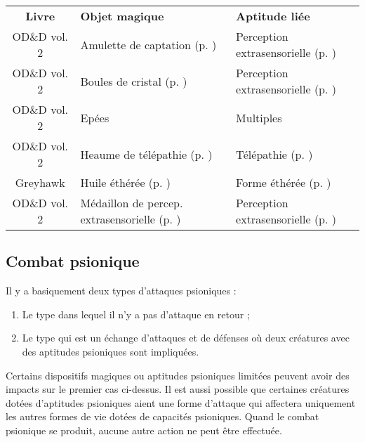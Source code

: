 \bigskip
\begin{tabular}{cll}
\textbf{Livre}  & \textbf{Objet magique}    & \textbf{Aptitude liée} \\
OD\&D vol. 2     & Amulette de captation (p. \pageref{objet-amulette-captation}) & Perception extrasensorielle (p. \pageref{magicien-ESP}) \\
OD\&D vol. 2     & Boules de cristal (p. \pageref{objet-boule-cristal}) & Perception extrasensorielle (p. \pageref{magicien-ESP}) \\
OD\&D vol. 2     & Epées                     & Multiples \\
OD\&D vol. 2     & Heaume de télépathie (p. \pageref{objet-heaume-telepathie})   & Télépathie (p. \pageref{objet-heaume-telepathie})  \\
Greyhawk        & Huile éthérée (p. \pageref{objet-huile-etheree}) & Forme éthérée (p. \pageref{magicien-forme-etheree}) \\
OD\&D vol. 2     & Médaillon de percep. extrasensorielle (p. \pageref{objet-medaillon-esp}) & Perception extrasensorielle (p. \pageref{magicien-ESP}) \\
\end{tabular}


\subsection*{Combat psionique}

Il y a basiquement deux types d'attaques psioniques :

\bigskip

\begin{enumerate}
\item Le type dans lequel il n'y a pas d'attaque en retour ;
\item Le type qui est un échange d'attaques et de défenses où deux créatures avec des aptitudes psioniques sont impliquées.
\end{enumerate}

\bigskip

Certains dispositifs magiques ou aptitudes psioniques limitées peuvent avoir des impacts sur le premier cas ci-dessus. Il est aussi possible que certaines créatures dotées d'aptitudes psioniques aient une forme d'attaque qui affectera uniquement les autres formes de vie dotées de capacités psioniques. Quand le combat psionique se produit, aucune autre action ne peut être effectuée.

